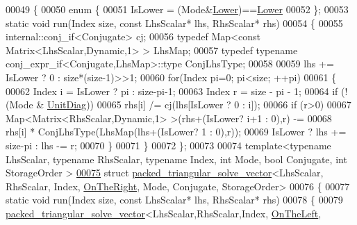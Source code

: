 \begin{DoxyCode}
00049 \{
00050   \textcolor{keyword}{enum} \{
00051     IsLower = (Mode&\hyperlink{group__enums_gga39e3366ff5554d731e7dc8bb642f83cda891792b8ed394f7607ab16dd716f60e6}{Lower})==\hyperlink{group__enums_gga39e3366ff5554d731e7dc8bb642f83cda891792b8ed394f7607ab16dd716f60e6}{Lower}
00052   \};
00053   \textcolor{keyword}{static} \textcolor{keywordtype}{void} run(Index size, \textcolor{keyword}{const} LhsScalar* lhs, RhsScalar* rhs)
00054   \{
00055     internal::conj\_if<Conjugate> cj;
00056     \textcolor{keyword}{typedef} Map<const Matrix<LhsScalar,Dynamic,1> > LhsMap;
00057     \textcolor{keyword}{typedef} \textcolor{keyword}{typename} conj\_expr\_if<Conjugate,LhsMap>::type ConjLhsType;
00058 
00059     lhs += IsLower ? 0 : size*(size-1)>>1;
00060     \textcolor{keywordflow}{for}(Index pi=0; pi<size; ++pi)
00061     \{
00062       Index i = IsLower ? pi : size-pi-1;
00063       Index r = size - pi - 1;
00064       \textcolor{keywordflow}{if} (!(Mode & \hyperlink{group__enums_gga39e3366ff5554d731e7dc8bb642f83cdaddb72f888ac85d5a1c52333e54f9374b}{UnitDiag}))
00065     rhs[i] /= cj(lhs[IsLower ? 0 : i]);
00066       \textcolor{keywordflow}{if} (r>0)
00067     Map<Matrix<RhsScalar,Dynamic,1> >(rhs+(IsLower? i+1 : 0),r) -=
00068         rhs[i] * ConjLhsType(LhsMap(lhs+(IsLower? 1 : 0),r));
00069       IsLower ? lhs += size-pi : lhs -= r;
00070     \}
00071   \}
00072 \};
00073 
00074 \textcolor{keyword}{template}<\textcolor{keyword}{typename} LhsScalar, \textcolor{keyword}{typename} RhsScalar, \textcolor{keyword}{typename} Index, \textcolor{keywordtype}{int} Mode, \textcolor{keywordtype}{bool} Conjugate, \textcolor{keywordtype}{int} StorageOrder
      >
\hyperlink{structinternal_1_1packed__triangular__solve__vector_3_01_lhs_scalar_00_01_rhs_scalar_00_01_indexbdf75792bc56c9c47813436504c36746}{00075} \textcolor{keyword}{struct }\hyperlink{structinternal_1_1packed__triangular__solve__vector}{packed\_triangular\_solve\_vector}<LhsScalar, RhsScalar, Index, 
      \hyperlink{group__enums_ggac22de43beeac7a78b384f99bed5cee0ba99dc75d8e00b6c3a5bdc31940f47492b}{OnTheRight}, Mode, Conjugate, StorageOrder>
00076 \{
00077   \textcolor{keyword}{static} \textcolor{keywordtype}{void} run(Index size, \textcolor{keyword}{const} LhsScalar* lhs, RhsScalar* rhs)
00078   \{
00079     \hyperlink{structinternal_1_1packed__triangular__solve__vector}{packed\_triangular\_solve\_vector}<LhsScalar,RhsScalar,Index,
      \hyperlink{group__enums_ggac22de43beeac7a78b384f99bed5cee0ba129609b3bdf23b071f5f86cf2f995ec4}{OnTheLeft},

\end{DoxyCode}
